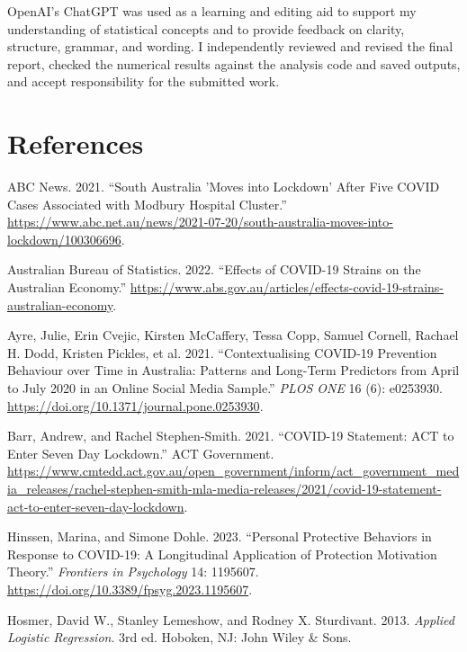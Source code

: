 \documentclass[
  12pt,
  a4paper,
]{article}
\newlength{\cslhangindent}
\newenvironment{CSLReferences}[2] %
 {\begin{list}{}{%
  \setlength{\itemindent}{0pt}
  \setlength{\leftmargin}{0pt}
  \setlength{\parsep}{0pt}
  \ifodd #1
   \setlength{\leftmargin}{\cslhangindent}
   \setlength{\itemindent}{-1\cslhangindent}
  \fi
  \setlength{\itemsep}{#2\baselineskip}}}
 {\end{list}}
\begin{document}
OpenAI's ChatGPT was used as a learning and editing aid to support my understanding of statistical concepts and to provide feedback on clarity, structure, grammar, and wording. I independently reviewed and revised the final report, checked the numerical results against the analysis code and saved outputs, and accept responsibility for the submitted work.

\section{References}\label{references}

\label{refs}
\begin{CSLReferences}{1}{0}
ABC News. 2021. {``South Australia 'Moves into Lockdown' After Five COVID Cases Associated with Modbury Hospital Cluster.''} \url{https://www.abc.net.au/news/2021-07-20/south-australia-moves-into-lockdown/100306696}.

Australian Bureau of Statistics. 2022. {``Effects of COVID-19 Strains on the Australian Economy.''} \url{https://www.abs.gov.au/articles/effects-covid-19-strains-australian-economy}.

Ayre, Julie, Erin Cvejic, Kirsten McCaffery, Tessa Copp, Samuel Cornell, Rachael H. Dodd, Kristen Pickles, et al. 2021. {``Contextualising COVID-19 Prevention Behaviour over Time in Australia: Patterns and Long-Term Predictors from April to July 2020 in an Online Social Media Sample.''} \emph{PLOS ONE} 16 (6): e0253930. \url{https://doi.org/10.1371/journal.pone.0253930}.

Barr, Andrew, and Rachel Stephen-Smith. 2021. {``COVID-19 Statement: ACT to Enter Seven Day Lockdown.''} ACT Government. \url{https://www.cmtedd.act.gov.au/open_government/inform/act_government_media_releases/rachel-stephen-smith-mla-media-releases/2021/covid-19-statement-act-to-enter-seven-day-lockdown}.

Hinssen, Marina, and Simone Dohle. 2023. {``Personal Protective Behaviors in Response to COVID-19: A Longitudinal Application of Protection Motivation Theory.''} \emph{Frontiers in Psychology} 14: 1195607. \url{https://doi.org/10.3389/fpsyg.2023.1195607}.

Hosmer, David W., Stanley Lemeshow, and Rodney X. Sturdivant. 2013. \emph{Applied Logistic Regression}. 3rd ed. Hoboken, NJ: John Wiley \& Sons.


\end{CSLReferences}
\end{document}

